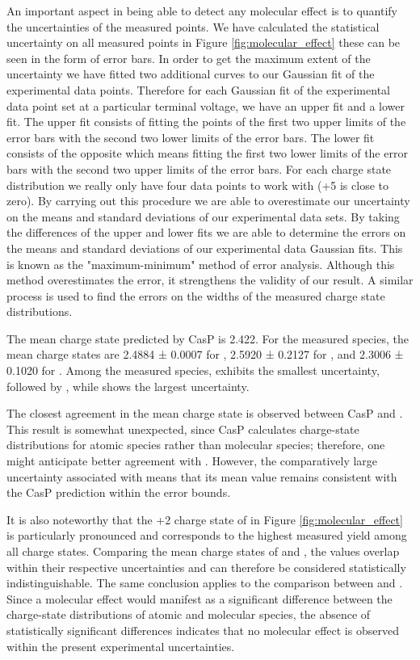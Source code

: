 \documentclass[a4paper,fleqn,review]{cas-sc}
\begin{document}
An important aspect in  being able to detect any molecular effect is to quantify the uncertainties of the measured points. We have calculated the statistical uncertainty on all measured points in Figure \ref{fig:molecular_effect}  these can be seen in the form of error bars.  In order to get the maximum extent of the uncertainty we have fitted two additional curves  to our Gaussian fit of the experimental data points.  Therefore for each Gaussian fit of the experimental data point set at a particular terminal voltage, we have an upper fit and a lower fit. The upper fit consists of fitting the points of the first two upper limits of the error bars with the second two lower limits of the error bars. The lower fit consists of the opposite which means fitting the first two lower limits of the error bars with the second two upper limits of the error bars. For each charge state distribution we really only have four data points to work with (+5 is close to zero). By carrying out this procedure we are able to overestimate our uncertainty on the means and standard deviations of our experimental data sets. By taking the differences of the upper and lower fits we are able to determine the errors on the means and standard deviations of our experimental data Gaussian fits. This is known as the "maximum-minimum" method of error analysis. Although this method overestimates the error, it strengthens the validity of our result. A similar process is used to find the errors on the widths of the measured charge state distributions.   

The mean charge state predicted by CasP is 2.422. For the measured species, the mean charge states are 2.4884 ± 0.0007 for , 2.5920 ± 0.2127 for , and 2.3006 ± 0.1020 for . Among the measured species,  exhibits the smallest uncertainty, followed by , while  shows the largest uncertainty.

The closest agreement in the mean charge state is observed between CasP and . This result is somewhat unexpected, since CasP calculates charge-state distributions for atomic species rather than molecular species; therefore, one might anticipate better agreement with . However, the comparatively large uncertainty associated with  means that its mean value remains consistent with the CasP prediction within the error bounds.

It is also noteworthy that the +2 charge state of  in Figure \ref{fig:molecular_effect} is particularly pronounced and corresponds to the highest measured yield among all charge states. Comparing the mean charge states of  and , the values overlap within their respective uncertainties and can therefore be considered statistically indistinguishable. The same conclusion applies to the comparison between  and . Since a molecular effect would manifest as a significant difference between the charge-state distributions of atomic and molecular species, the absence of statistically significant differences indicates that no molecular effect is observed within the present experimental uncertainties.
\end{document}

